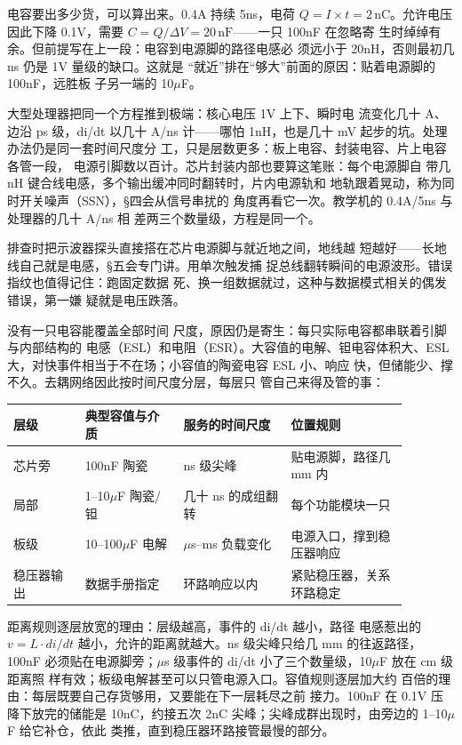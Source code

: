 电容要出多少货，可以算出来。0.4A 持续 5ns，电荷 $Q = I
\times t = 2\,\mathrm{nC}$。允许电压因此下降 0.1V，需要
$C = Q/\Delta V = 20\,\mathrm{nF}$——一只 100nF 在忽略寄
生时绰绰有余。但前提写在上一段：电容到电源脚的路径电感必
须远小于 20nH，否则最初几 ns 仍是 1V 量级的缺口。这就是
“就近”排在“够大”前面的原因：贴着电源脚的 100nF，远胜板
子另一端的 10$\mu$F。

大型处理器把同一个方程推到极端：核心电压 1V 上下、瞬时电
流变化几十 A、边沿 ps 级，di/dt 以几十 A/ns 计——哪怕
1nH，也是几十 mV 起步的坑。处理办法仍是同一套时间尺度分
工，只是层数更多：板上电容、封装电容、片上电容各管一段，
电源引脚数以百计。芯片封装内部也要算这笔账：每个电源脚自
带几 nH 键合线电感，多个输出缓冲同时翻转时，片内电源轨和
地轨跟着晃动，称为同时开关噪声（SSN），§四会从信号串扰的
角度再看它一次。教学机的 0.4A/5ns 与处理器的几十 A/ns 相
差两三个数量级，方程是同一个。

排查时把示波器探头直接搭在芯片电源脚与就近地之间，地线越
短越好——长地线自己就是电感，§五会专门讲。用单次触发捕
捉总线翻转瞬间的电源波形。错误指纹也值得记住：跑固定数据
死、换一组数据就过，这种与数据模式相关的偶发错误，第一嫌
疑就是电压跌落。

没有一只电容能覆盖全部时间
尺度，原因仍是寄生：每只实际电容都串联着引脚与内部结构的
电感（ESL）和电阻（ESR）。大容值的电解、钽电容体积大、ESL
大，对快事件相当于不在场；小容值的陶瓷电容 ESL 小、响应
快，但储能少、撑不久。去耦网络因此按时间尺度分层，每层只
管自己来得及管的事：

\begin{longtable}{L{0.16\linewidth}L{0.22\linewidth}L{0.24\linewidth}L{0.26\linewidth}}
\toprule
层级 & 典型容值与介质 & 服务的时间尺度 & 位置规则 \\
\midrule
芯片旁 & 100nF 陶瓷 & ns 级尖峰 & 贴电源脚，路径几 mm 内 \\
局部 & 1--10$\mu$F 陶瓷/钽 & 几十 ns 的成组翻转 & 每个功能模块一只 \\
板级 & 10--100$\mu$F 电解 & $\mu$s--ms 负载变化 & 电源入口，撑到稳压器响应 \\
稳压器输出 & 数据手册指定 & 环路响应以内 & 紧贴稳压器，关系环路稳定 \\
\bottomrule
\end{longtable}

距离规则逐层放宽的理由：层级越高，事件的 di/dt 越小，路径
电感惹出的 $v = L \cdot di/dt$ 越小，允许的距离就越大。ns
级尖峰只给几 mm 的往返路径，100nF 必须贴在电源脚旁；$\mu$s
级事件的 di/dt 小了三个数量级，10$\mu$F 放在 cm 级距离照
样有效；板级电解甚至可以只管电源入口。容值规则逐层加大约
百倍的理由：每层既要自己存货够用，又要能在下一层耗尽之前
接力。100nF 在 0.1V 压降下放完的储能是 10nC，约接五次 2nC
尖峰；尖峰成群出现时，由旁边的 1--10$\mu$F 给它补仓，依此
类推，直到稳压器环路接管最慢的部分。

